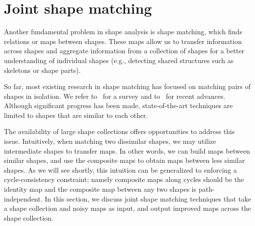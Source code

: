\section{Joint shape matching}
\label{sec:matching}

Another fundamental problem in shape analysis is shape matching, which finds relations or maps between shapes. These maps allow us to transfer information across shapes and aggregate information from a collection of shapes for a better understanding of individual shapes (e.g., detecting shared structures such as skeletons or shape parts). 

So far, most existing research in shape matching has focused on matching pairs of shapes in isolation. We refer to~\cite{van-Kaick:2010:SSC} for a survey and to~\cite{Leordeanu:2005:SM,Lipman:2009:MVC,van-Kaick:2010:SSC,Ovsjanikov:2010:OPM,Kim:2011:BIM,Ovsjanikov:2012:FMF} for recent advances. Although significant progress has been made,
state-of-the-art techniques are limited to shapes that are similar to each other. 

The availability of large shape collections offers opportunities to address this issue. Intuitively, when matching two dissimilar shapes, we may utilize intermediate shapes to transfer maps. In other words, we can build maps between similar shapes, and use the composite maps to obtain maps between less similar shapes. As we will see shortly, this intuition can be generalized to enforcing a cycle-consistency constraint; namely composite maps along cycles should be the identity map and the composite map between any two shapes is path-independent.
%
In this section, we discuss joint shape matching techniques that take a shape collection and noisy maps as input, and output improved maps across the shape collection.

